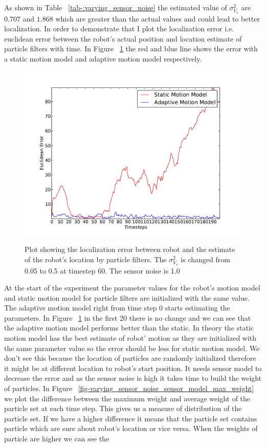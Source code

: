\documentclass[12pt]{dalcsthesis}
\begin{document}
As shown in Table ~\ref{tab-:varying_sensor_noise} the estimated value of $\sigma_{V_{v}}^2$ are $0.707$ and $1.868$ which are greater than the actual values and could lead to better localization. In order to demonstrate that I plot the localization error i.e. euclidean error between the robot's actual position and location estimate of particle filters with time. In Figure ~\ref{fig-varying_sensor_noise} the red and blue line shows the error with a static motion model and adaptive motion model respectively.

 
 
\begin{figure}
  \centering
     {\includegraphics[height = 3.0 in]{./plots/200_005_05_s_10.pdf}}
  \caption{\label{fig-varying_sensor_noise}Plot showing the localization error between robot and the estimate of the robot's location by particle filters. The $\sigma_{V_{v}}^{2}$ is changed from 0.05 to 0.5 at timestep 60. The sensor noise is 1.0}
\end{figure}
At the start of the experiment the parameter values for the robot's motion model and static motion model for particle filters are initialized with the same value. The adaptive motion model right from time step 0 starts estimating the parameters. In Figure ~\ref{fig-varying_sensor_noise} in the first $20$ there is no change and we can see that the adaptive motion model performs better than the static. In theory the static motion model has the best estimate of robot' motion as they are initialized with the same parameter value so the error should be less for static motion model. We don't see this because the location of particles are randomly initialized therefore it might be at different location to robot's start position. It needs sensor model to decrease the error and as the sensor noise is high it takes time to build the weight of particles. In Figure ~\ref{fig-varying_sensor_noise_sensor_model_max_weight} we plot the difference between the maximum weight and average weight of the particle set at each time step. This gives us a measure of distribution of the particle set. If we have a higher difference it means that the particle set contains particle which are sure about robot's location or vice versa. When the weights of particle are higher we can see the 
\end{document}
